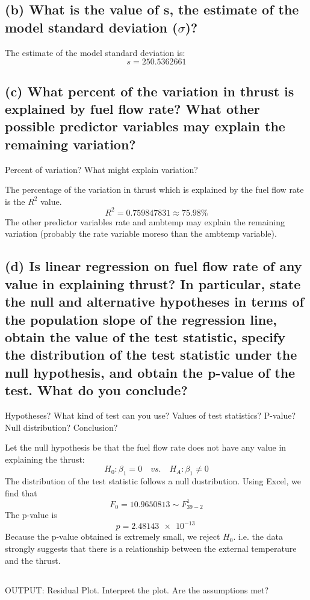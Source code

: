 \documentclass[letterpaper]{article}
\begin{document}
\subsection{(b)	What is the value of s, the estimate of the model standard deviation ($\sigma$)?}
The estimate of the model standard deviation is:
$$s = 250.5362661$$

\subsection{(c)	What percent of the variation in  thrust is explained by fuel flow rate? What other possible predictor variables may explain the remaining variation?}
Percent of variation? What might explain variation?

The percentage of the variation in thrust which is explained by the fuel flow rate
is the $R^2$ value.
$$R^2 = 0.759847831 \approx 75.98\%$$
The other predictor variables rate and ambtemp may explain the remaining variation
(probably the rate variable moreso than the ambtemp variable).

\subsection{(d)	Is linear regression on fuel flow rate of any value in explaining thrust? In particular, state the
 null and alternative hypotheses in terms of the population slope of the regression line, obtain the value of the test statistic, specify the distribution of the test statistic under the null hypothesis, and obtain the p-value of the test. What do you conclude?}
Hypotheses? What kind of test can you use? Values of test
statistics? P-value? Null distribution? Conclusion?

Let the null hypothesis be that the fuel flow rate does not have any value in explaining the thrust:
$$ H_0: \beta_1 =0 \quad vs. \quad H_A: \beta_1 \neq 0 $$
The distribution of the test statistic follows a null dustribution.
Using Excel, we find that
$$F_0 = 10.9650813 \sim F_{39-2}^{1}$$
The p-value is
$$p= \SI{2.48143e-13}{} $$
Because the p-value obtained is extremely small, we reject $H_0$. i.e. the data strongly suggests that there is a relationship between the external temperature and the thrust.

\setcounter{subsection}{6}
\subsection{}
OUTPUT: Residual Plot. Interpret the plot. Are the assumptions met?
\end{document}
